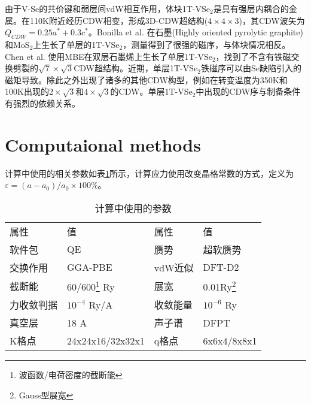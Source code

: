 \documentclass[reprint, aps, prb, showkeys]{revtex4-2}
\begin{document}
由于V-Se的共价键和弱层间vdW相互作用，体块1T-VSe$_2$是具有强层内耦合的金属。在110K附近经历CDW相变，形成3D-CDW超结构($4 \times 4 \times 3$)，其CDW波矢为$Q_{CDW} = 0.25a^* + 0.3c^*$。Bonilla et al. 在石墨(Highly oriented pyrolytic graphite)和MoS$_2$上生长了单层的1T-VSe$_2$，测量得到了很强的磁序，与体块情况相反。Chen et al. 使用MBE在双层石墨烯上生长了单层1T-VSe$_2$，找到了不含有铁磁交换劈裂的$\sqrt{7} \times \sqrt{3}$CDW超结构。近期，单层1T-VSe$_2$铁磁序可以由Se缺陷引入的磁矩导致。除此之外出现了诸多的其他CDW构型，例如在转变温度为350K和100K出现的$2 \times \sqrt{3}$和$4 \times \sqrt{3}$的CDW。单层1T-VSe$_2$中出现的CDW序与制备条件有强烈的依赖关系。

\section{Computaional methods}
计算中使用的相关参数如表\ref{Tab:parameter}所示，计算应力使用改变晶格常数的方式，定义为$\varepsilon = (a - a_0)/a_0 \times 100\%$。
\begin{table}[b]
    \caption{\label{Tab:parameter} 计算中使用的参数} 
\begin{ruledtabular}
    \begin{tabular}{llll}
    \textrm{属性}&
    \textrm{值}&
    \textrm{属性}&
    \textrm{值}\\
    软件包   & QE                             & 赝势    & 超软赝势        \\
    交换作用  & GGA-PBE                                     & vdW近似 & DFT-D2         \\
    截断能   & 60/600\footnote{波函数/电荷密度的截断能} Ry & 展宽    & 0.01Ry\footnote{Gauss型展宽} \\
    力收敛判据 & $10^{-4}$ Ry/A                             & 收敛能量  & $10^{-6}$ Ry  \\
    真空层   & 18 A                                         & 声子谱   & DFPT          \\
    K格点   & 24x24x16/32x32x1                              & q格点   & 6x6x4/8x8x1     
    \end{tabular}
\end{ruledtabular}
\end{table}
\end{document}
